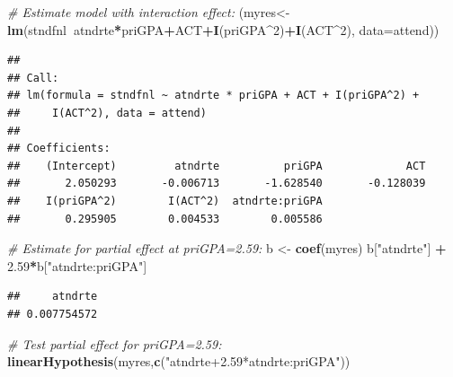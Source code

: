 \documentclass[]{book}
\newenvironment{Shaded}{\begin{snugshade}}{\end{snugshade}}
\newcommand{\CommentTok}[1]{\textcolor[rgb]{0.56,0.35,0.01}{\textit{#1}}}
\newcommand{\DataTypeTok}[1]{\textcolor[rgb]{0.13,0.29,0.53}{#1}}
\newcommand{\DecValTok}[1]{\textcolor[rgb]{0.00,0.00,0.81}{#1}}
\newcommand{\FloatTok}[1]{\textcolor[rgb]{0.00,0.00,0.81}{#1}}
\newcommand{\KeywordTok}[1]{\textcolor[rgb]{0.13,0.29,0.53}{\textbf{#1}}}
\newcommand{\NormalTok}[1]{#1}
\newcommand{\OperatorTok}[1]{\textcolor[rgb]{0.81,0.36,0.00}{\textbf{#1}}}
\newcommand{\StringTok}[1]{\textcolor[rgb]{0.31,0.60,0.02}{#1}}
\begin{document}
\begin{Shaded}
\begin{Highlighting}[]
\CommentTok{# Estimate model with interaction effect:}
\NormalTok{(myres<-}\KeywordTok{lm}\NormalTok{(stndfnl}\OperatorTok{~}\NormalTok{atndrte}\OperatorTok{*}\NormalTok{priGPA}\OperatorTok{+}\NormalTok{ACT}\OperatorTok{+}\KeywordTok{I}\NormalTok{(priGPA}\OperatorTok{^}\DecValTok{2}\NormalTok{)}\OperatorTok{+}\KeywordTok{I}\NormalTok{(ACT}\OperatorTok{^}\DecValTok{2}\NormalTok{), }\DataTypeTok{data=}\NormalTok{attend))}
\end{Highlighting}
\end{Shaded}

\begin{verbatim}
## 
## Call:
## lm(formula = stndfnl ~ atndrte * priGPA + ACT + I(priGPA^2) + 
##     I(ACT^2), data = attend)
## 
## Coefficients:
##    (Intercept)         atndrte          priGPA             ACT  
##       2.050293       -0.006713       -1.628540       -0.128039  
##    I(priGPA^2)        I(ACT^2)  atndrte:priGPA  
##       0.295905        0.004533        0.005586
\end{verbatim}

\begin{Shaded}
\begin{Highlighting}[]
\CommentTok{# Estimate for partial effect at priGPA=2.59:}
\NormalTok{b <-}\StringTok{ }\KeywordTok{coef}\NormalTok{(myres)}
\NormalTok{b[}\StringTok{"atndrte"}\NormalTok{] }\OperatorTok{+}\StringTok{ }\FloatTok{2.59}\OperatorTok{*}\NormalTok{b[}\StringTok{"atndrte:priGPA"}\NormalTok{] }
\end{Highlighting}
\end{Shaded}

\begin{verbatim}
##     atndrte 
## 0.007754572
\end{verbatim}

\begin{Shaded}
\begin{Highlighting}[]
\CommentTok{# Test partial effect for priGPA=2.59:}
\KeywordTok{linearHypothesis}\NormalTok{(myres,}\KeywordTok{c}\NormalTok{(}\StringTok{"atndrte+2.59*atndrte:priGPA"}\NormalTok{))}
\end{Highlighting}
\end{Shaded}
\end{document}

